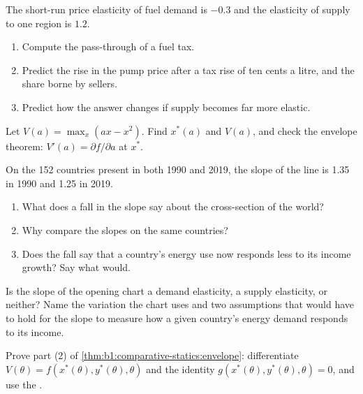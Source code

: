 \begin{exercise}[$\star\star$]\label{exo:b1:comparative-statics:fuel}
The short-run price elasticity of fuel demand is $-0.3$ and the elasticity
of supply to one region is $1.2$.
\begin{enumerate}
  \item Compute the pass-through of a fuel tax.
  \item Predict the rise in the pump price after a tax rise of ten cents a litre, and the share borne by sellers.
  \item Predict how the answer changes if supply becomes far more elastic.
\end{enumerate}
\end{exercise}

\begin{exercise}[$\star\star$]\label{exo:b1:comparative-statics:envelope-simple}
Let $V(a) = \max_x (ax - x^2)$. Find $x^*(a)$ and $V(a)$, and check the
envelope theorem: $V'(a) = \partial f/\partial a$ at $x^*$.
\end{exercise}

\begin{exercise}[$\star\star$]\label{exo:b1:comparative-statics:two-years}
On the 152 countries present in both 1990 and 2019, the slope of the line
is 1.35 in 1990 and 1.25 in 2019. %
\begin{enumerate}
  \item What does a fall in the slope say about the cross-section of the world?
  \item Why compare the slopes on the same countries?
  \item Does the fall say that a country's energy use now responds less to its income growth? Say what would.
\end{enumerate}
\end{exercise}

\begin{exercise}[$\star\star$]\label{exo:b1:comparative-statics:which-curve}
Is the slope of the opening chart a demand elasticity, a supply
elasticity, or neither? Name the variation the chart uses and two
assumptions that would have to hold for the slope to measure how a given
country's energy demand responds to its income.
\end{exercise}

\begin{exercise}[$\star\star\star$]\label{exo:b1:comparative-statics:envelope-proof}
Prove part (2) of \cref{thm:b1:comparative-statics:envelope}: differentiate
$V(\theta) = f(x^*(\theta), y^*(\theta), \theta)$ and the identity
$g(x^*(\theta), y^*(\theta), \theta) = 0$, and use the .
\end{exercise}

